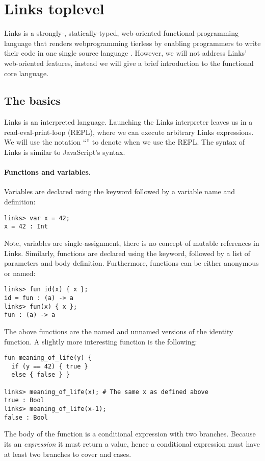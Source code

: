 \section{Links toplevel}
Links is a strongly-, statically-typed, web-oriented functional programming language that renders webprogramming tierless by enabling programmers to write their code in one single source language \cite{Cooper2006,Links}. However, we will not address Links' web-oriented features, instead we will give a brief introduction to the functional core language.

\subsection{The basics}
Links is an interpreted language. Launching the Links interpreter leaves us in a read-eval-print-loop (REPL), where we can execute arbitrary Links expressions. We will use the notation ``'' to denote when we use the REPL. The syntax of Links is similar to JavaScript's syntax.

\paragraph{Functions and variables.}
Variables are declared using the  keyword followed by a variable name and definition:
\begin{lstlisting}[style=links]
links> var x = 42;
x = 42 : Int
\end{lstlisting}
Note, variables are single-assignment, there is no concept of mutable references in Links.
Similarly, functions are declared using the  keyword, followed by a list of parameters and body definition. Furthermore, functions can be either anonymous or named:
\begin{lstlisting}[style=links]
links> fun id(x) { x };
id = fun : (a) -> a
links> fun(x) { x };
fun : (a) -> a
\end{lstlisting}
The above functions are the named and unnamed versions of the identity function. A slightly more interesting function is the following:
\begin{lstlisting}[style=links]
fun meaning_of_life(y) {
  if (y == 42) { true }
  else { false } }

links> meaning_of_life(x); # The same x as defined above
true : Bool
links> meaning_of_life(x-1);
false : Bool
\end{lstlisting}
The body of the function  is a conditional expression with two branches. Because its an \emph{expression} it must return a value, hence a conditional expression must  have at least two branches to cover  and  cases.

